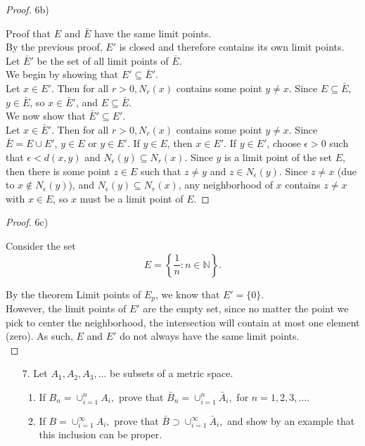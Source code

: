 \documentclass[10pt]{article}
\theoremstyle{definition}
\theoremstyle{plain}
\newcommand{\N}{\mathbb{N}}
\begin{document}
\begin{proof}
6b)

Proof that $E$ and $\bar{E}$ have the same limit points. \\

By the previous proof, $E'$ is closed and therefore contains its own limit points. \\

Let $\bar{E}'$ be the set of all limit points of $\bar{E}$. \\

We begin by showing that $E'\subseteq \bar{E}'$. \\

Let $x\in E'$. Then for all $r>0, N_r(x)$ contains some point $y\neq x$. Since $E\subseteq\bar{E}$, $y\in\bar{E}$, so $x\in\bar{E}'$, and $E\subseteq\bar{E}$. \\

We now show that $\bar{E}'\subseteq E'$. \\

Let $x\in\bar{E}'$. Then for all $r>0, N_r(x)$ contains some point $y\neq x$. Since $\bar{E} = E\cup E'$, $y\in E$ or $y\in E'$. If $y\in E$, then $x\in E'$. If $y\in E'$, choose $\epsilon>0$ such that $\epsilon < d(x,y)$ and $N_\epsilon(y) \subseteq N_r(x)$. Since $y$ is a limit point of the set $E$, then there is some point $z\in E$ such that $z\neq y$ and $z\in N_\epsilon(y)$. Since $z\neq x$ (due to $x\not\in N_\epsilon(y)$), and $N_\epsilon(y) \subseteq N_r(x)$, any neighborhood of $x$ contains $z\neq x$ with $x\in E$, so $x$ must be a limit point of $E$.
\end{proof}

\begin{proof}
 6c)
 
  Consider the set
  $$E = \left\{\frac{1}{n}: n\in\N\right\}.$$

  By the theorem Limit points of $E_p$, we know that $E' = \{0\}$. \\
  
  However, the limit points of $E'$ are the empty set, since no matter the point we pick to center the neighborhood, the intersection will contain at most one element (zero). As such, $E$ and $E'$ do not always have the same limit points. \\
\end{proof}



\pagebreak



\begin{enumerate}
\item[7.] Let $A_1,A_2,A_3,\dots$ be subsets of a metric space.
\begin{enumerate}
  \item If $B_n = \cup_{i=1}^{n} A_i,$ prove that $\bar{B}_n = \cup_{i=1}^{n} \bar{A}_i,$ for $n=1,2,3,\dots$.
  \item If $B = \cup_{i=1}^{\infty} A_i,$ prove that $\bar{B} \supset \cup_{i=1}^{\infty} \bar{A}_i,$ and show by an example that this inclusion can be proper.
\end{enumerate}

\end{enumerate}
\end{document}
